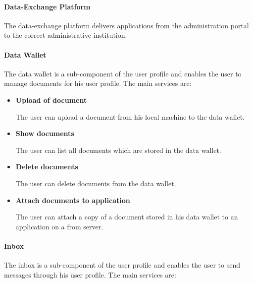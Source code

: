 \documentclass[
     12pt,         %
     a4paper,      %
     BCOR=10mm,version=first,     %
     DIV=14,version=first,        %
     ]{scrreprt}
\begin{document}
\paragraph{Data-Exchange Platform}
The data-exchange platform delivers applications from the administration portal to the correct administrative institution.

\paragraph{Data Wallet}
The data wallet is a sub-component of the user profile and enables the user to manage documents for his user profile. The main services are:

\begin{itemize}

    \item \textbf{Upload of document}
    
    The user can upload a document from his local machine to the data wallet.
    
    \item \textbf{Show documents}
    
    The user can list all documents which are stored in the data wallet.
    
    \item \textbf{Delete documents}
    
    The user can delete documents from the data wallet.
    
    \item \textbf{Attach documents to application}
    
    The user can attach a copy of a document stored in his data wallet to an application on a from server.

\end{itemize}


\paragraph{Inbox}
The inbox is a sub-component of the user profile and enables the user to send messages through his user profile. The main services are:
    
\end{document}
